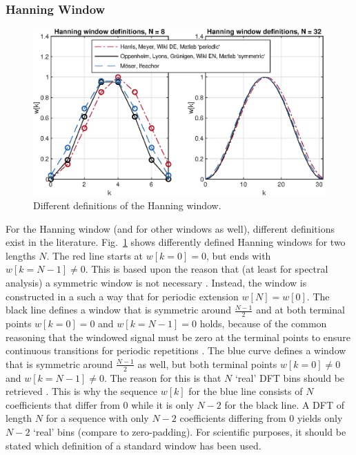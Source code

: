 \documentclass[11pt,a4paper,DIV=12]{scrartcl}
\begin{document}
\subsubsection{Hanning Window}
\begin{figure}
		\centering
		\includegraphics[]{graphics/HannDefinitionen}
		\caption{Different definitions of the Hanning window.}
		\label{HannDefinitionen}
\end{figure}

For the Hanning window (and for other windows as well), different definitions
exist in the literature.
%
Fig.~\ref{HannDefinitionen} shows differently defined Hanning windows for two
lengths $N$.
%
The red line starts at $w[k=0]=0$, but ends with $w[k=N-1]\neq0$.
%
This is based upon the reason that (at least for spectral analysis) a symmetric
window is not necessary \cite[p.~52]{Harris1978}.
%
Instead, the window is constructed in a such a way that for periodic extension
$w[N]=w[0]$.
%
The black line defines a window that is symmetric around $\frac{N-1}{2}$ and at
both terminal points $w[k=0]=0$ and $w[k=N-1]=0$ holds, because of the common
reasoning that the windowed signal must be zero at the terminal points to
ensure continuous transitions for periodic repetitions
\cite{Oppenheim2010, Lyons2011}.
%
The blue curve defines a window that is symmetric around $\frac{N-1}{2}$ as well,
but both terminal points $w[k=0]\neq0$ and $w[k=N-1]\neq0$.
%
The reason for this is that $N$ `real' DFT bins should be retrieved
\cite{Moeser2011, Ifeachor2002}.
%
This is why the sequence $w[k]$ for the blue line consists of $N$ coefficients
that differ from 0 while it is only $N-2$ for the black line.
%
A DFT of length $N$ for a sequence with only $N-2$ coefficients differing from
0 yields only $N-2$ `real' bins (compare to zero-padding).
%
For scientific purposes, it should be stated which definition of a standard
window has been used.
\end{document}
